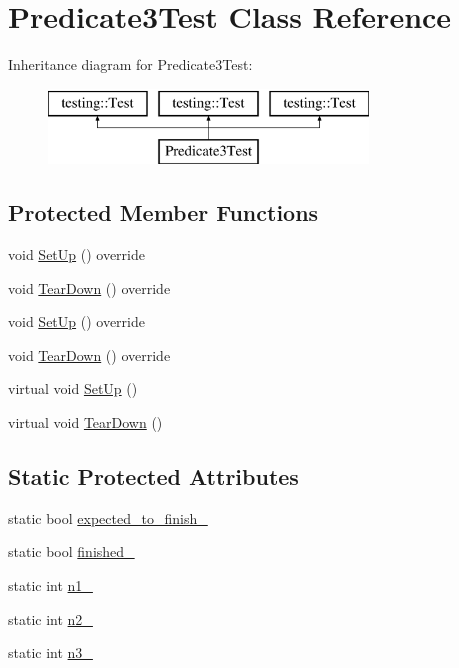 \hypertarget{class_predicate3_test}{}\section{Predicate3\+Test Class Reference}
\label{class_predicate3_test}
Inheritance diagram for Predicate3\+Test\+:\begin{figure}[H]
\begin{center}
\leavevmode
\includegraphics[height=2.000000cm]{d1/d50/class_predicate3_test}
\end{center}
\end{figure}
\subsection*{Protected Member Functions}
\begin{DoxyCompactItemize}
\item 
void \mbox{\hyperlink{class_predicate3_test_a4f70b241201bac1bfee5d159702188b4}{Set\+Up}} () override
\item 
void \mbox{\hyperlink{class_predicate3_test_a502f4426fc9f90991a7aadbb304794e6}{Tear\+Down}} () override
\item 
void \mbox{\hyperlink{class_predicate3_test_a4f70b241201bac1bfee5d159702188b4}{Set\+Up}} () override
\item 
void \mbox{\hyperlink{class_predicate3_test_a502f4426fc9f90991a7aadbb304794e6}{Tear\+Down}} () override
\item 
virtual void \mbox{\hyperlink{class_predicate3_test_a92aad9566e0737b6739d1db14e7912be}{Set\+Up}} ()
\item 
virtual void \mbox{\hyperlink{class_predicate3_test_aa4dc395bded849b6e5175566d791aba7}{Tear\+Down}} ()
\end{DoxyCompactItemize}
\subsection*{Static Protected Attributes}
\begin{DoxyCompactItemize}
\item 
static bool \mbox{\hyperlink{class_predicate3_test_a42c11555410ee89bf6e59d39336a212c}{expected\+\_\+to\+\_\+finish\+\_\+}}
\item 
static bool \mbox{\hyperlink{class_predicate3_test_aa2ef0fa6aed09d872fb9ae36961b49eb}{finished\+\_\+}}
\item 
static int \mbox{\hyperlink{class_predicate3_test_ac232320a93f0c1e09886148a3e1929a5}{n1\+\_\+}}
\item 
static int \mbox{\hyperlink{class_predicate3_test_a11049ef16bcaadc8262faf7349c7676e}{n2\+\_\+}}
\item 
static int \mbox{\hyperlink{class_predicate3_test_afc1df6b079ffe22b87479b161d2ad2f7}{n3\+\_\+}}
\end{DoxyCompactItemize}

